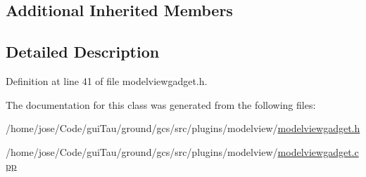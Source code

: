 \subsection*{Additional Inherited Members}


\subsection{Detailed Description}


Definition at line 41 of file modelviewgadget.\-h.



The documentation for this class was generated from the following files\-:\begin{DoxyCompactItemize}
\item 
/home/jose/\-Code/gui\-Tau/ground/gcs/src/plugins/modelview/\hyperlink{modelviewgadget_8h}{modelviewgadget.\-h}\item 
/home/jose/\-Code/gui\-Tau/ground/gcs/src/plugins/modelview/\hyperlink{modelviewgadget_8cpp}{modelviewgadget.\-cpp}\end{DoxyCompactItemize}
